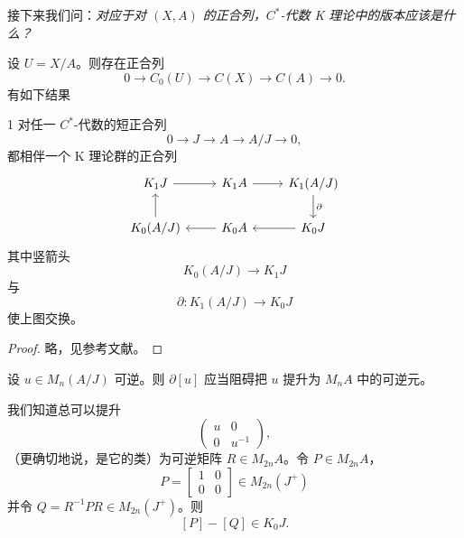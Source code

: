 接下来我们问：\emph{对应于对 $(X,A)$ 的正合列，$C^*$-代数 K 理论中的版本应该是什么？}

设 $U = X/A$。则存在正合列
\[
  0 \to C_0(U) \to C(X) \to C(A) \to 0.
\]
有如下结果

\begin{thm}{1}
对任一 $C^*$-代数的短正合列
\[
  0 \to J \to A \to A/J \to 0,
\]
都相伴一个 K 理论群的正合列
\[
  \begin{tikzcd}
    K_1 J \arrow[r] & K_1 A \arrow[r] & K_1(A/J) \arrow[d,"\partial"] \\
    K_0(A/J) \arrow[u] & K_0 A \arrow[l] & K_0 J \arrow[l]
  \end{tikzcd}
\]
其中竖箭头
\[
  K_0(A/J) \to K_1 J
\]
与
\[
  \partial : K_1(A/J) \to K_0 J
\]
使上图交换。
\end{thm}


\begin{proof}
略，见参考文献。
\end{proof}

设 $u\in M_n(A/J)$ 可逆。则 $\partial[u]$ 应当阻碍把 $u$ 提升为 $M_nA$ 中的可逆元。

我们知道总可以提升
\[
  \begin{pmatrix} u & 0 \\ 0 & u^{-1} \end{pmatrix},
\]
（更确切地说，是它的类）为可逆矩阵 $R\in M_{2n}A$。令 $P\in M_{2n}A$，
\[
  P = \begin{bmatrix} 1 & 0 \\ 0 & 0 \end{bmatrix} \in M_{2n}(J^+)
\]
并令 $Q = R^{-1}PR \in M_{2n}(J^+)$。则
\[
  [P]-[Q] \in K_0 J.
\]


